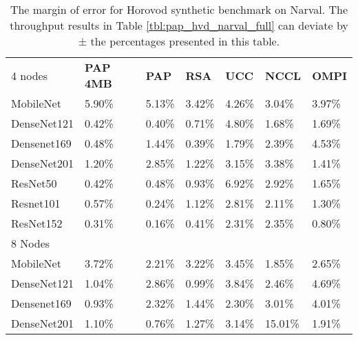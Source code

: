 
\begin{table}
    \centering
    \caption[PAP-Aware Horovod Error on Narval]{
        The margin of error for Horovod synthetic benchmark on Narval.
        The throughput results in Table \ref{tbl:pap_hvd_narval_full} can deviate by ± the percentages presented in this table. 
    }
    \begin{tabular}{lllllll}
    4 nodes    & \textbf{PAP 4MB} & \textbf{PAP} & \textbf{RSA} & \textbf{UCC} & \textbf{NCCL} & \textbf{OMPI} \\
    MobileNet   & 5.90\%  & 5.13\% & 3.42\% & 4.26\% & 3.04\%  & 3.97\% \\
    DenseNet121 & 0.42\%  & 0.40\% & 0.71\% & 4.80\% & 1.68\%  & 1.69\% \\
    Densenet169 & 0.48\%  & 1.44\% & 0.39\% & 1.79\% & 2.39\%  & 4.53\% \\
    DenseNet201 & 1.20\%  & 2.85\% & 1.22\% & 3.15\% & 3.38\%  & 1.41\% \\
    ResNet50    & 0.42\%  & 0.48\% & 0.93\% & 6.92\% & 2.92\%  & 1.65\% \\
    Resnet101   & 0.57\%  & 0.24\% & 1.12\% & 2.81\% & 2.11\%  & 1.30\% \\
    ResNet152   & 0.31\%  & 0.16\% & 0.41\% & 2.31\% & 2.35\%  & 0.80\% \\ \hline
    8 Nodes     & ~       & ~      & ~      & ~      & ~       & ~      \\
    MobileNet   & 3.72\%  & 2.21\% & 3.22\% & 3.45\% & 1.85\%  & 2.65\% \\
    DenseNet121 & 1.04\%  & 2.86\% & 0.99\% & 3.84\% & 2.46\%  & 4.69\% \\
    Densenet169 & 0.93\%  & 2.32\% & 1.44\% & 2.30\% & 3.01\%  & 4.01\% \\
    DenseNet201 & 1.10\%  & 0.76\% & 1.27\% & 3.14\% & 15.01\% & 1.91\% \\

\end{tabular}
\end{table}
